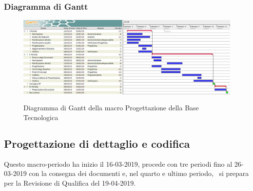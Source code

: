         \begin{landscape}
			\subsubsection{Diagramma di Gantt}        
			\begin{figure}[H]
					\centering
					\includegraphics[scale=0.49]{img/Progettazione_della_base_tecnologica.png}\\
					\caption{Diagramma di Gantt della macro Progettazione della Base Tecnologica}
			\end{figure}
		\end{landscape}
		\newpage

        \subsection{Progettazione di dettaglio e codifica}
        Questo macro-periodo ha inizio il 16-03-2019, procede con tre periodi fino al 26-03-2019 con la consegna dei documenti e, nel
        quarto e ultimo periodo, \gruppo\ si prepara per la Revisione di Qualifica del 19-04-2019.
        
